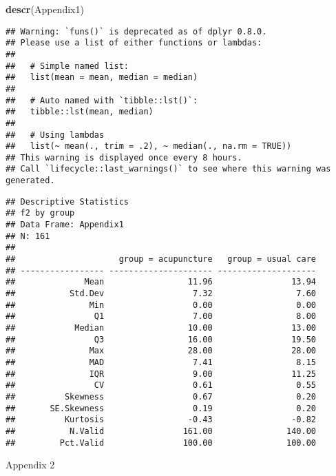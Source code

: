\documentclass[
]{article}
\newenvironment{Shaded}{\begin{snugshade}}{\end{snugshade}}
\newcommand{\KeywordTok}[1]{\textcolor[rgb]{0.13,0.29,0.53}{\textbf{#1}}}
\newcommand{\NormalTok}[1]{#1}
\newcommand{\OperatorTok}[1]{\textcolor[rgb]{0.81,0.36,0.00}{\textbf{#1}}}
\newcommand{\StringTok}[1]{\textcolor[rgb]{0.31,0.60,0.02}{#1}}
\begin{document}
\begin{Shaded}
\begin{Highlighting}[]
\KeywordTok{descr}\NormalTok{(Appendix1)}
\end{Highlighting}
\end{Shaded}

\begin{verbatim}
## Warning: `funs()` is deprecated as of dplyr 0.8.0.
## Please use a list of either functions or lambdas: 
## 
##   # Simple named list: 
##   list(mean = mean, median = median)
## 
##   # Auto named with `tibble::lst()`: 
##   tibble::lst(mean, median)
## 
##   # Using lambdas
##   list(~ mean(., trim = .2), ~ median(., na.rm = TRUE))
## This warning is displayed once every 8 hours.
## Call `lifecycle::last_warnings()` to see where this warning was generated.
\end{verbatim}

\begin{verbatim}
## Descriptive Statistics  
## f2 by group  
## Data Frame: Appendix1  
## N: 161  
## 
##                     group = acupuncture   group = usual care
## ----------------- --------------------- --------------------
##              Mean                 11.96                13.94
##           Std.Dev                  7.32                 7.60
##               Min                  0.00                 0.00
##                Q1                  7.00                 8.00
##            Median                 10.00                13.00
##                Q3                 16.00                19.50
##               Max                 28.00                28.00
##               MAD                  7.41                 8.15
##               IQR                  9.00                11.25
##                CV                  0.61                 0.55
##          Skewness                  0.67                 0.20
##       SE.Skewness                  0.19                 0.20
##          Kurtosis                 -0.43                -0.82
##           N.Valid                161.00               140.00
##         Pct.Valid                100.00               100.00
\end{verbatim}

Appendix 2

\begin{Shaded}
\end{Shaded}
\end{document}
